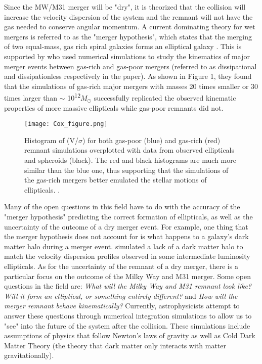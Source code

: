 \documentclass[twocolumn]{aastex63}
\begin{document}
Since the MW/M31 merger will be "dry", it is theorized that the collision will increase the velocity dispersion of the system and the remnant will not have the gas needed to conserve angular momentum.  A current dominating theory for wet mergers is referred to as the "merger hypothesis", which states that the merging of two equal-mass, gas rich spiral galaxies forms an elliptical galaxy \citep{1972ApJ...178..623T}.  This is supported by \cite{2006ApJ...650..791C} who used numerical simulations to study the kinematics of major merger events between gas-rich and gas-poor mergers (referred to as dissipational and dissipationless respectively in the paper).  As shown in Figure 1, they found that the simulations of gas-rich major mergers with masses 20 times smaller or 30 times larger than $\sim$ 10\textsuperscript{12}$M_{\odot}$ successfully replicated the observed kinematic properties of more massive ellipticals while gas-poor remnants did not.   

\begin{figure}
    \centering
    \texttt{[image: Cox\_figure.png]}
    \caption{Histogram of (V/$\sigma$) for both gas-poor (blue) and gas-rich (red) remnant simulations overplotted with data from observed ellipticals and spheroids (black).  The red and black histograms are much more similar than the blue one, thus supporting that the simulations of the gas-rich mergers better emulated the stellar motions of ellipticals. \citep{2006ApJ...650..791C}.}
    \label{fig:my_label}
\end{figure}

Many of the open questions in this field have to do with the accuracy of the "merger hypothesis" predicting the correct formation of ellipticals, as well as the uncertainty of the outcome of a dry merger event.  For example, one thing that the merger hypothesis does not account for is what happens to a galaxy's dark matter halo during a merger event. \cite{2003Sci...301.1696R} simulated a lack of a dark matter halo to match the velocity dispersion profiles observed in some intermediate luminosity ellipticals. As for the uncertainty of the remnant of a dry merger, there is a particular focus on the outcome of the Milky Way and M31 merger.  Some open questions in the field are: \textit{What will the Milky Way and M31 remnant look like?} \textit{Will it form an elliptical, or something entirely different?} and \textit{How will the merger remnant behave kinematically?}  Currently, astrophysicists attempt to answer these questions through numerical integration simulations to allow us to "see" into the future of the system after the collision.  These simulations include assumptions of physics that follow Newton's laws of gravity as well as Cold Dark Matter Theory (the theory that dark matter only interacts with matter gravitationally).    
\end{document}
